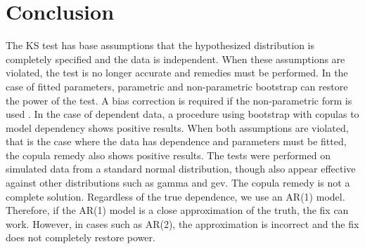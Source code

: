 \documentclass[12pt, letterpaper, titlepage]{article}
\begin{document}
\section{Conclusion}\label{sec:conclusion}

The KS test has base assumptions that the hypothesized distribution is completely specified
and the data is independent. When these assumptions are violated, the test is no
longer accurate and remedies must be performed. In the case of fitted parameters, 
parametric and non-parametric bootstrap can restore the power of the test. A bias 
correction is required if the non-parametric form is used \citep{Babu}. In the case of dependent
data, a procedure using bootstrap with copulas to model dependency shows positive results.
When both assumptions are violated, that is the case where the data has dependence and 
parameters must be fitted, the copula remedy also shows positive results. The tests were 
performed on simulated data from a standard normal distribution, though also appear effective
against other distributions such as gamma and gev. The copula remedy
is not a complete solution. Regardless of the true dependence, we use an AR(1) model.
Therefore, if the AR(1) model is a close approximation of the truth, the fix can work.
However, in cases such as AR(2), the approximation is incorrect and the fix does not 
completely restore power.




\end{document}
